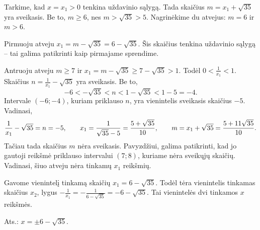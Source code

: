 \documentclass[11pt,a4paper]{article}
\newcommand{\hm}[1]{\nobreak\hspace{0pt}#1\nobreak\hspace{0pt}}
\begin{document}
Tarkime, kad $x=x_1>0$ tenkina uždavinio sąlygą. Tada
skaičius $m=x_1 + \sqrt{35}$ yra sveikasis.
Be to, $m\geq 6$, nes $m >\sqrt{35}>5$. Nagrinėkime du atvejus: $m=6$ ir $m>6$.

Pirmuoju atveju $x_1 =m-\sqrt{35}=6-\sqrt{35}$. Šis skaičius tenkina uždavinio sąlygą -- tai galima patikrinti kaip pirmajame sprendime.

Antruoju atveju $m\geq7$ ir $x_1 = m-\sqrt{35}\geq 7-\sqrt{35}>1$. Todėl $0<\frac{1}{x_1}<1$. 
Skaičius  $n=\frac{1}{x_1} - \sqrt{35} $ yra sveikasis. Be to,
\[
-6 <   - \sqrt{35}< n < 1 - \sqrt{35} <1-5=-4.
\]
Intervale $(-6; -4)$, kuriam priklauso $n$, yra vienintelis sveikasis skaičius $-5$. 
Vadinasi, $$\frac{1}{x_1} - \sqrt{35} =n\hm{=} -5,\qquad x_1 =\frac{1}{\sqrt{35}-5}=\frac{5+ \sqrt{35}}{10},\qquad m =x_1+\sqrt{35}= \frac{5+ 11\sqrt{35}}{10}.$$ 
Tačiau tada skaičius $m$ nėra sveikasis. Pavyzdžiui, galima patikrinti, kad jo gautoji reikšmė priklauso intervalui $(7; 8)$, kuriame nėra sveikųjų skaičių. 
Vadinasi, šiuo atveju nėra tinkamų $x_1$ reikšmių.

Gavome vienintelį tinkamą skaičių $x_1=6-\sqrt{35}$. Todėl tėra vienintelis tinkamas skaičius $x_2$, lygus $-\frac1{x_1}=-\frac1{6-\sqrt{35}}=-6-\sqrt{35}$. Tai vienintelės dvi tinkamos $x$ reikšmės.
\begin{flushright}
     Ats.: $x = \pm6-\sqrt{35}$.
\end{flushright}

\vspace{0,7cm}
\end{document}
